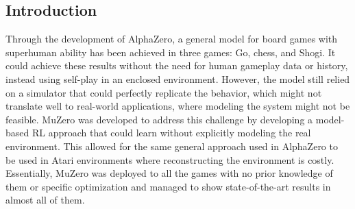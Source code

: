 \subsection{Introduction}
Through the development of AlphaZero, a general model for board games with
superhuman ability has been achieved in three games: Go, chess, and Shogi. It
could achieve these results without the need for human gameplay data or
history, instead using self-play in an enclosed environment. However, the model
still relied on a simulator that could perfectly replicate the behavior, which
might not translate well to real-world applications, where modeling the system
might not be feasible. MuZero was developed to address this challenge by
developing a model-based RL approach that could learn without explicitly
modeling the real environment. This allowed for the same general approach used
in AlphaZero to be used in Atari environments where reconstructing the
environment is costly. Essentially, MuZero was deployed to all the games with
no prior knowledge of them or specific optimization and managed to show
state-of-the-art results in almost all of them.

